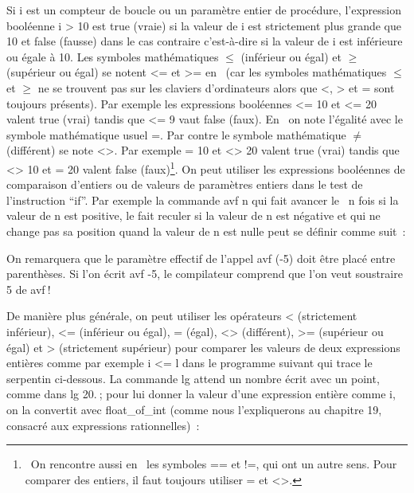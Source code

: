 Si {\idt i} est un compteur de boucle ou un paramètre entier de procédure,
l'expression booléenne {\idt i > 10} est {\idt true} (vraie)
si la valeur de {\idt i} est strictement plus grande que 10 et {\idt
false} (fausse) dans le cas contraire c'est-à-dire si la valeur de {\idt
i} est inférieure ou égale à 10.  Les symboles mathématiques $\leq$
(inférieur ou égal) et $\geq$ (supérieur ou égal) se notent {\idt <=} et
{\idt >=} en \ocaml\ (car les symboles mathématiques $\leq$ et $\geq$ ne
se trouvent pas sur les claviers d'ordinateurs alors que {\idt <}, {\idt >}
et {\idt =} sont toujours présents).  Par exemple les expressions
booléennes { <= 10} et { <= 20} valent {\idt true}
(vrai) tandis que { <= 9} vaut {\idt false} (faux).  En
\ocaml\ on note l'égalité avec le symbole mathématique usuel {\idt =}.
Par contre le symbole mathématique $\neq$ (différent) se note {\idt <>}.
Par exemple { = 10} et { <> 20} valent {\idt true}
(vrai) tandis que { <> 10} et { = 20} valent {\idt
false} (faux)\footnote{\ On rencontre aussi en \ocaml\ les symboles
{\idt ==} et {\ttfamily\idt !=}, qui ont un autre sens. Pour comparer des
entiers, il faut toujours utiliser {\idt =} et {\idt <>}.}.
On peut utiliser les expressions booléennes de
comparaison d'entiers ou de valeurs de paramètres entiers dans le test
de l'instruction ``if''.  Par exemple la commande {\idt avf n} qui
fait avancer le \robot\ {\idt n} fois si la valeur de {\idt n} est
positive, le fait reculer si la valeur de {\idt n} est négative et qui
ne change pas sa position quand la valeur de {\idt n} est nulle peut
se définir comme suit~:



\noindent On remarquera que le paramètre effectif {} de l'appel
{\idt avf (-5)} doit être placé entre parenthèses. Si l'on écrit
{\idt avf -5}, le compilateur comprend que l'on veut soustraire 5 de
{\idt avf}$\:$!

De manière plus générale, on peut utiliser les opérateurs {\idt <} (strictement inférieur), {\idt <=} (inférieur ou égal),
{\idt =} (égal), {\idt <>} (différent), {\idt >=} (supérieur ou égal) et {\idt >} (strictement supérieur) pour comparer les valeurs
de deux expressions entières comme par exemple {\idt i <= l} dans le programme suivant qui trace le serpentin
ci-dessous. La commande {\idt lg} attend un nombre écrit avec un point, comme
dans {\idt lg 20.}$\:$; pour lui donner la valeur d'une expression entière comme
{\idt i}, on la convertit avec {\idt float\_of\_int} (comme nous l'expliquerons
au chapitre 19, consacré aux expressions rationnelles)~:

